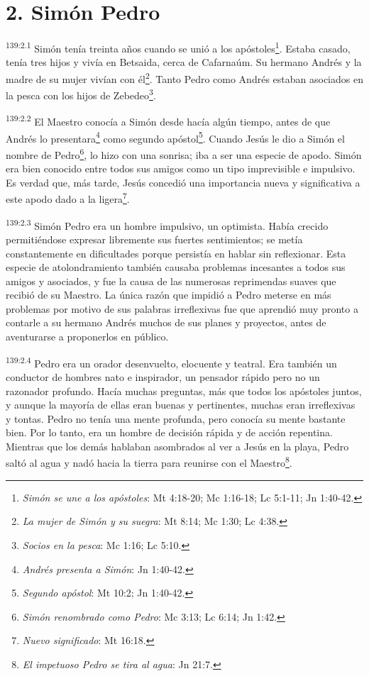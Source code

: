 \section*{2. Simón Pedro}
\par
\textsuperscript{139:2.1} Simón tenía treinta años cuando se unió a los apóstoles\footnote{\textit{Simón se une a los apóstoles}: Mt 4:18-20; Mc 1:16-18; Lc 5:1-11; Jn 1:40-42.}. Estaba casado, tenía tres hijos y vivía en Betsaida, cerca de Cafarnaúm. Su hermano Andrés y la madre de su mujer vivían con él\footnote{\textit{La mujer de Simón y su suegra}: Mt 8:14; Mc 1:30; Lc 4:38.}. Tanto Pedro como Andrés estaban asociados en la pesca con los hijos de Zebedeo\footnote{\textit{Socios en la pesca}: Mc 1:16; Lc 5:10.}.

\par
\textsuperscript{139:2.2} El Maestro conocía a Simón desde hacía algún tiempo, antes de que Andrés lo presentara\footnote{\textit{Andrés presenta a Simón}: Jn 1:40-42.} como segundo apóstol\footnote{\textit{Segundo apóstol}: Mt 10:2; Jn 1:40-42.}. Cuando Jesús le dio a Simón el nombre de Pedro\footnote{\textit{Simón renombrado como Pedro}: Mc 3:13; Lc 6:14; Jn 1:42.}, lo hizo con una sonrisa; iba a ser una especie de apodo. Simón era bien conocido entre todos sus amigos como un tipo imprevisible e impulsivo. Es verdad que, más tarde, Jesús concedió una importancia nueva y significativa a este apodo dado a la ligera\footnote{\textit{Nuevo significado}: Mt 16:18.}.

\par
\textsuperscript{139:2.3} Simón Pedro era un hombre impulsivo, un optimista. Había crecido permitiéndose expresar libremente sus fuertes sentimientos; se metía constantemente en dificultades porque persistía en hablar sin reflexionar. Esta especie de atolondramiento también causaba problemas incesantes a todos sus amigos y asociados, y fue la causa de las numerosas reprimendas suaves que recibió de su Maestro. La única razón que impidió a Pedro meterse en más problemas por motivo de sus palabras irreflexivas fue que aprendió muy pronto a contarle a su hermano Andrés muchos de sus planes y proyectos, antes de aventurarse a proponerlos en público.

\par
\textsuperscript{139:2.4} Pedro era un orador desenvuelto, elocuente y teatral. Era también un conductor de hombres nato e inspirador, un pensador rápido pero no un razonador profundo. Hacía muchas preguntas, más que todos los apóstoles juntos, y aunque la mayoría de ellas eran buenas y pertinentes, muchas eran irreflexivas y tontas. Pedro no tenía una mente profunda, pero conocía su mente bastante bien. Por lo tanto, era un hombre de decisión rápida y de acción repentina. Mientras que los demás hablaban asombrados al ver a Jesús en la playa, Pedro saltó al agua y nadó hacia la tierra para reunirse con el Maestro\footnote{\textit{El impetuoso Pedro se tira al agua}: Jn 21:7.}.

